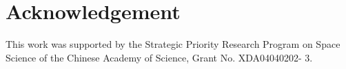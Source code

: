 \documentclass[5p, times]{elsarticle}
\begin{document}

\section*{Acknowledgement}

This work was supported by the Strategic Priority Research Program on Space Science of the Chinese Academy of Science, Grant No. XDA04040202- 3. 
\end{document}
